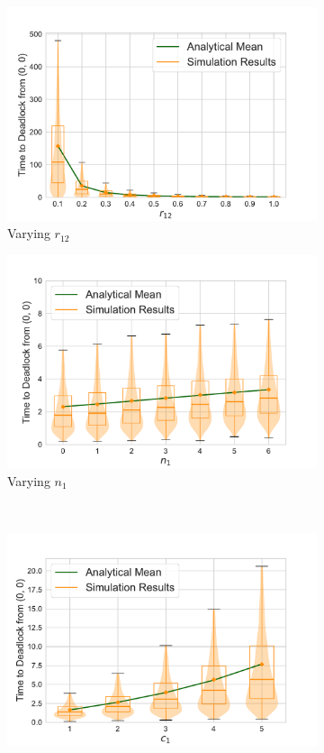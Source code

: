 \documentclass{article}
\numberwithin{equation}{section}
\begin{document}
\begin{figure}[!htbp]
\begin{center}
\begin{subfigure}[b]{0.48\textwidth}
    \includegraphics[width=\textwidth]{images/2Nms_varyr12}
    \caption{Varying $r_{12}$}
    \label{fig:2Nms_r11}
  \end{subfigure}
  \begin{subfigure}[b]{0.48\textwidth}
    \includegraphics[width=\textwidth]{images/2Nms_varyn1}
    \caption{Varying $n_1$}
    \label{fig:2Nms_n}
  \end{subfigure}\\
  \begin{subfigure}[b]{0.48\textwidth}
    \includegraphics[width=\textwidth]{images/2Nms_varyc1}

\end{subfigure}
\end{center}
\end{figure}
\end{document}
